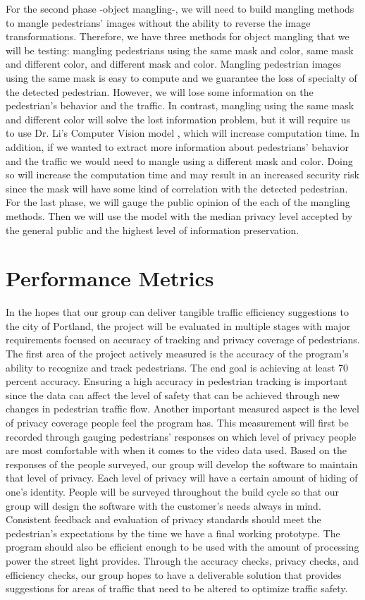 For the second phase -object mangling-, we will need to build mangling methods to mangle pedestrians' images without the ability to reverse the image transformations. Therefore, we have three methods for object mangling that we will be testing: mangling pedestrians using the same mask and color, same mask and different color, and different mask and color. Mangling pedestrian images using the same mask is easy to compute and we guarantee the loss of specialty of the detected pedestrian. However, we will lose some information on the pedestrian's behavior and the traffic. In contrast, mangling using the same mask and different color will solve the lost information problem, but it will require us to use Dr. Li's Computer Vision model \cite{limodel}, which will increase computation time. In addition, if we wanted to extract more information about pedestrians' behavior and the traffic we would need to mangle using a different mask and color. Doing so will increase the computation time and may result in an increased security risk since the mask will have some kind of correlation with the detected pedestrian. For the last phase, we will gauge the public opinion of the each of the mangling methods. Then we will use the model with the median privacy level accepted by the general public and the highest level of information preservation.

\section{Performance Metrics}

In the hopes that our group can deliver tangible traffic efficiency suggestions to the city of Portland, the project will be evaluated in multiple stages with major requirements focused on accuracy of tracking and privacy coverage of pedestrians. The first area of the project actively measured is the accuracy of the program's ability to recognize and track pedestrians. The end goal is achieving at least 70 percent accuracy. Ensuring a high accuracy in pedestrian tracking is important since the data can affect the level of safety that can be achieved through new changes in pedestrian traffic flow. Another important measured aspect is the level of privacy coverage people feel the program has. This measurement will first be recorded through gauging pedestrians' responses on which level of privacy people are most comfortable with when it comes to the video data used. Based on the responses of the people surveyed, our group will develop the software to maintain that level of privacy. Each level of privacy will have a certain amount of hiding of one’s identity. People will be surveyed throughout the build cycle so that our group will design the software with the customer’s needs always in mind. Consistent feedback and evaluation of privacy standards should meet the pedestrian's expectations by the time we have a final working prototype. The program should also be efficient enough to be used with the amount of processing power the street light provides. Through the accuracy checks, privacy checks, and efficiency checks, our group hopes to have a deliverable solution that provides suggestions for areas of traffic that need to be altered to optimize traffic safety.
